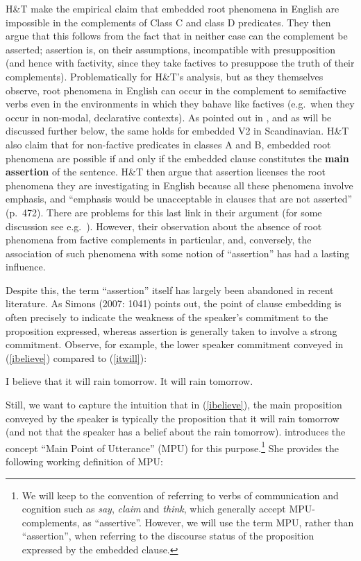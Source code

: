 \documentclass[output=paper]{LSP/langsci}
\begin{document}
H\&T make the empirical claim that embedded root phenomena in English are impossible in the complements of Class C and class D predicates. They then argue that this follows from the fact that in neither case can the complement be asserted; assertion is, on their assumptions, incompatible with presupposition (and hence with factivity, since they take factives to presuppose the truth of their complements). Problematically for H\&T's analysis, but as they themselves observe, root phenomena in English can occur in the complement to semifactive verbs even in the environments in which they bahave like factives (e.g.\ when they occur in non-modal, declarative contexts). As pointed out in \cite{wiklund-etal09}, and as will be discussed further below, the same holds for embedded V2 in Scandinavian.  H\&T also claim that for non-factive predicates in classes A and B, embedded root phenomena are possible if and only if the embedded clause constitutes the \textbf{main assertion} of the sentence. H\&T then argue that assertion licenses the root phenomena they are investigating in English because all these phenomena involve emphasis, and ``emphasis would be unacceptable in clauses that are not asserted'' (p.\ 472). There are problems for this last link in their argument (for some discussion see e.g.\ \citealt{heycock06}).  However, their observation about the absence of root phenomena from factive complements in particular, and, conversely, the association of such phenomena with some notion of ``assertion'' has had a lasting influence.

Despite this, the term ``assertion'' itself has largely been abandoned in recent literature. As Simons (2007: 1041) points out, the point of clause embedding is often precisely to indicate the weakness of the speaker's commitment to the proposition expressed, whereas assertion is generally taken to involve a strong commitment. Observe, for example,  the lower speaker commitment conveyed in (\ref{ibelieve}) compared to (\ref{itwill}):  

\begin{exe}
	\ex I believe that it will rain tomorrow.  \label{ibelieve}
	\ex It will rain tomorrow. \label{itwill}
\end{exe}

Still, we want to capture the intuition that in (\ref{ibelieve}), the main proposition conveyed by the speaker is typically the proposition that it will rain tomorrow (and not that the speaker has a belief about the rain tomorrow). \cite{simons07} introduces the concept ``Main Point of Utterance'' (MPU) for this purpose.\footnote{We will keep to the convention of referring to verbs of communication and cognition such as \textit{say}, \textit{claim} and \textit{think}, which generally accept MPU-complements, as ``assertive''. However, we will use the term MPU, rather than ``assertion'', when referring to the discourse status of the proposition expressed by the embedded clause. } She provides the following working definition of MPU:
\end{document}
